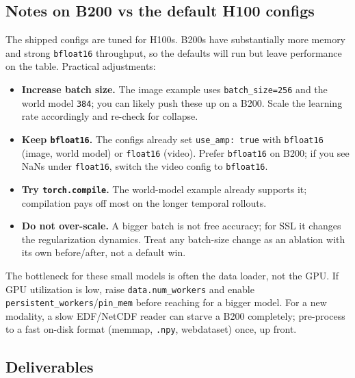 \documentclass{article}
\newcommand{\code}[1]{\texttt{\small #1}}
\begin{document}
\subsection{Notes on B200 vs the default H100 configs}

The shipped configs are tuned for H100s. B200s have substantially more memory and
strong \code{bfloat16} throughput, so the defaults will run but leave performance on
the table. Practical adjustments:

\begin{itemize}[leftmargin=1.4em,itemsep=1pt,topsep=2pt]
  \item \textbf{Increase batch size.} The image example uses \code{batch\_size=256}
    and the world model \code{384}; you can likely push these up on a B200. Scale
    the learning rate accordingly and re-check for collapse.
  \item \textbf{Keep \code{bfloat16}.} The configs already set \code{use\_amp: true}
    with \code{bfloat16} (image, world model) or \code{float16} (video). Prefer
    \code{bfloat16} on B200; if you see NaNs under \code{float16}, switch the video
    config to \code{bfloat16}.
  \item \textbf{Try \code{torch.compile}.} The world-model example already supports
    it; compilation pays off most on the longer temporal rollouts.
  \item \textbf{Do not over-scale.} A bigger batch is not free accuracy; for SSL it
    changes the regularization dynamics. Treat any batch-size change as an ablation
    with its own before/after, not a default win.
\end{itemize}

\begin{tipbox}
The bottleneck for these small models is often the data loader, not the GPU. If
GPU utilization is low, raise \code{data.num\_workers} and enable
\code{persistent\_workers}/\code{pin\_mem} before reaching for a bigger model. For a
new modality, a slow EDF/NetCDF reader can starve a B200 completely; pre-process to
a fast on-disk format (memmap, \code{.npy}, webdataset) once, up front.
\end{tipbox}

\subsection{Deliverables}
\end{document}
